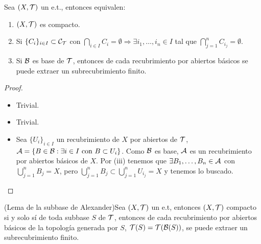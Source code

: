 \begin{prop}
    Sea $(X, \mathcal{T})$ un e.t., entonces equivalen:
    \begin{enumerate}
        \item[(i)] $(X, \mathcal{T})$ es compacto.
        \item[(ii)] Si $\{C_i\}_{i\in I} \subset \mathcal{C}_{\mathcal{T}}$ con $\bigcap\limits_{i\in I}C_i = \emptyset \Rightarrow \exists i_1,\dots,i_n\in I$ tal que $\bigcap\limits_{j=1}^n C_{i_j}=\emptyset$.
        \item[(iii)] Si $\mathcal{B}$ es base de $\mathcal{T}$, entonces de cada recubrimiento por abiertos básicos se puede extraer un subrecubrimiento finito.
    \end{enumerate}
    \begin{proof}\
        \begin{itemize}
            \item[(i)$\sii$(ii) )] Trivial.
            \item[(i)$\Rightarrow$(iii) )] Trivial.
            \item[(iii)$\Rightarrow$(i) )] Sea $\{U_i\}_{i\in I}$ un recubrimiento de $X$ por abiertos de $\mathcal{T}$, $\mathcal{A}=\{B\in \mathcal{B} : \exists i \in I \text{ con }B\subset U_i\}$. Como $\mathcal{B}$ es base, $\mathcal{A}$ es un recubrimiento por abiertos básicos de $X$. Por (iii) tenemos que $\exists B_1,\dots,B_n\in \mathcal{A}$ con $\bigcup\limits_{j=1}^n B_j = X$, pero $\bigcup\limits_{j=1}^n B_j \subset \bigcup\limits_{j=1}^n U_{i_j} = X$ y tenemos lo buscado.
        \end{itemize}
    \end{proof}
\end{prop}

\begin{lema}
    (Lema de la subbase de Alexander)Sea $(X, \mathcal{T})$ un e.t, entonces $(X, \mathcal{T})$ compacto si y solo sí de toda subbase $S$ de $\mathcal{T}$, entonces de cada recubrimiento por abiertos básicos de la topología generada por $S$, $\mathcal{T}(S) = \mathcal{T}(\mathcal{B}(S))$, se puede extraer un subrecubrimiento finito.
    \endsquare %
\end{lema}

